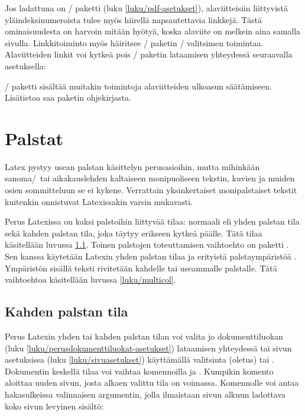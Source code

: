 Jos ladattuna on \-/ paketti (luku
\ref{luku/pdf-asetukset}), alaviitteisiin liittyvistä
yläindeksinumeroista tulee myös hiirellä napsautettavia linkkejä. Tästä
ominaisuudesta on harvoin mitään hyötyä, koska alaviite on melkein aina
samalla sivulla. Linkkitoiminto myös häiritsee \-/
paketin \-/ valitsimen toimintaa. Alaviitteiden linkit
voi kytkeä pois \-/ paketin lataamisen yhteydessä
seuraavalla asetuksella:

\begin{koodilohkosis}
\usepackage[hyperfootnotes=false]{hyperref}
\end{koodilohkosis}

\noindent
{}\-/ paketti sisältää muitakin toimintoja alaviitteiden
ulkoasun säätämiseen. Lisätietoa saa paketin ohjekirjasta.

\section{Palstat}
\label{luku/palstat}

Latex pystyy usean palstan käsittelyn perusasioihin, mutta mihinkään
sanoma\-/\ tai aikakauslehden kaltaiseen monipuoliseen tekstin, kuvien
ja muiden osien sommitteluun se ei kykene. Verrattain yksinkertaiset
monipalstaiset tekstit kuitenkin onnistuvat Latexissakin varsin
mukavasti.

Perus Latexissa on kaksi palstoihin liittyvää tilaa: normaali eli yhden
palstan tila sekä kahden palstan tila, joka täytyy erikseen kytkeä
päälle. Tätä tilaa käsitellään luvussa \ref{luku/kahden-palstan-tila}.
Toinen palstojen toteuttamisen vaihtoehto on paketti
. Sen kanssa käytetään Latexin yhden palstan tilaa ja
erityistä palstaympäristöä . Ympäristön sisällä
teksti rivitetään kahdelle tai useammalle palstalle. Tätä vaihtoehtoa
käsitellään luvussa \ref{luku/multicol}.

\subsection{Kahden palstan tila}
\label{luku/kahden-palstan-tila}

Perus Latexin yhden tai kahden palstan tilan voi valita jo
dokumenttiluokan (luku \ref{luku/perusdokumenttiluokat-asetukset})
lataamisen yhteydessä tai sivun asetuksissa (luku
\ref{luku/sivuasetukset}) käyttämällä valitsinta 
(oletus) tai . Dokumentin keskellä tilaa voi vaihtaa
komennoilla  ja . Kumpikin komento
aloittaa uuden sivun, josta alkaen valittu tila on voimassa. Komennolle
 voi antaa hakasulkeissa valinnaisen argumentin,
jolla ilmaistaan sivun alkuun ladottava koko sivun levyinen sisältö:

